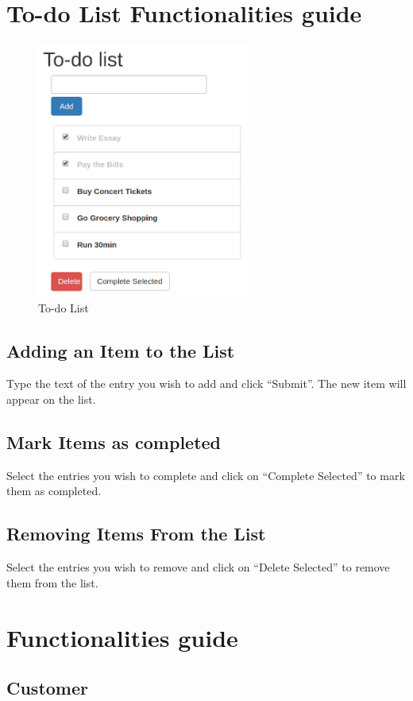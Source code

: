 \section{To-do List Functionalities guide}
\begin{figure}[H]
	\centering
	\includegraphics[width=7cm]{../../documenti/UserManualDemo/demo_screens/todo.png}
	\caption{To-do List}
\end{figure}
\subsection{Adding an Item to the List}
Type the text of the entry you wish to add and click ``Submit''. The new item will appear on the list.
\subsection{Mark Items as completed}
Select the entries you wish to complete and click on ``Complete Selected'' to mark them as completed. 
\subsection{Removing Items From the List}
Select the entries you wish to remove and click on ``Delete Selected'' to remove them from the list.

\section{\DemoName{} Functionalities guide}
\subsection{Customer}
